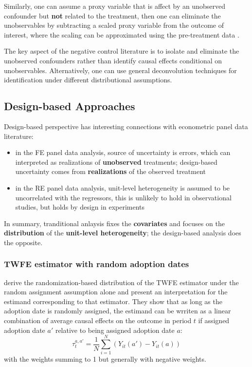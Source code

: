 \documentclass[twoside]{article}
\begin{document}
Similarly, one can assume a proxy variable that is affect by an unobserved confounder but \textbf{not} related to the treatment, then one can eliminate the unobservables by subtracting a scaled proxy variable from the outcome of interest, where the scaling can be approximated using the pre-treatment data \citep{freyaldenhoven2019pre}.

The key aspect of the negative control literature is to isolate and eliminate the unobserved confounders rather than identify causal effects conditional on unobservables. Alternatively, one can use general deconvolution techniques for identification under different distributional assumptions.

\subsection{Design-based Approaches}

Design-based perspective has interesting connections with econometric panel data literature:
\begin{itemize}
    \item in the FE panel data analysis, source of uncertainty is errors, which can interpreted as realizations of \textbf{unobserved} treatments; design-based uncertainty comes from \textbf{realizations} of the observed treatment 
    \item in the RE panel data analysis, unit-level heterogeneity is assumed to be uncorrelated with the regressors, this is unlikely to hold in observational studies, but holds by design in experiments
\end{itemize}
In summary, tranditional anlaysis fixes the \textbf{covariates} and focuses on the \textbf{distribution} of the \textbf{unit-level heterogeneity}; the design-based analysis does the opposite.

\subsubsection{TWFE estimator with random adoption dates}
\citet{athey2022design} derive the randomization-based distribution of the TWFE estimator under the random assignment assumption alone and present an interpretation for the estimand corresponding to that estimator.
They show that as long as the adoption date is randomly assigned, the estimand can be wrriten as a linear combination of average causal effects on the outcome in period $t$ if assigned adoption date $a'$ relative to being assigned adoption date $a$:
\begin{equation*}
    \tau_t^{a,a'} = \frac{1}{N}\sum^N_{i=1}\left( Y_{it}(a') - Y_{it}(a) \right)
\end{equation*}
with the weights summing to 1 but generally with negative weights.
\end{document}
